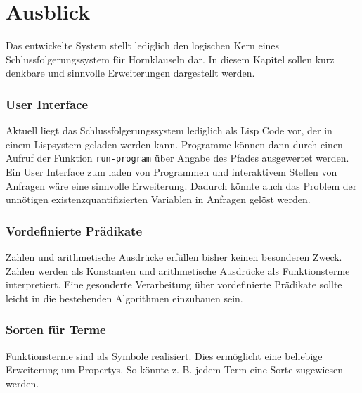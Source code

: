 \chapter{Ausblick}\label{ausblick}
Das entwickelte System stellt lediglich den logischen Kern eines Schlussfolgerungssystem f{\"u}r Hornklauseln dar. In diesem Kapitel sollen kurz denkbare und sinnvolle Erweiterungen dargestellt werden.

\subsection*{User Interface}
Aktuell liegt das Schlussfolgerungssystem lediglich als Lisp Code vor, der in einem Lispsystem geladen werden kann. Programme k{\"o}nnen dann durch einen Aufruf der Funktion {\tt run-program} {\"u}ber Angabe des Pfades ausgewertet werden. Ein User Interface zum laden von Programmen und interaktivem Stellen von Anfragen w{\"a}re eine sinnvolle Erweiterung. Dadurch k{\"o}nnte auch das Problem der unn{\"o}tigen existenzquantifizierten Variablen in Anfragen gel{\"o}st werden.

\subsection*{Vordefinierte Pr{\"a}dikate}
Zahlen und arithmetische Ausdr{\"u}cke erf{\"u}llen bisher keinen besonderen Zweck. Zahlen werden als Konstanten und arithmetische Ausdr{\"u}cke als Funktionsterme interpretiert. Eine gesonderte Verarbeitung {\"u}ber vordefinierte Pr{\"a}dikate sollte leicht in die bestehenden Algorithmen einzubauen sein.

\subsection*{Sorten f{\"u}r Terme}
Funktionsterme sind als Symbole realisiert. Dies erm{\"o}glicht eine beliebige Erweiterung um Propertys. So k{\"o}nnte z. B. jedem Term eine Sorte zugewiesen werden.
